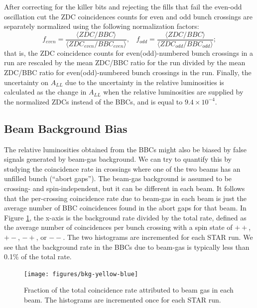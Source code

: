 After correcting for the killer bits and rejecting the fills that fail the
even-odd oscillation cut the ZDC coincidences counts for even and odd bunch
crossings are separately normalized using the following normalization factors:
%
\begin{equation}
  f_{even} = \frac{\langle ZDC/BBC \rangle}{\langle ZDC_{even}/BBC_{even} \rangle}, ~~~~
  f_{odd} = \frac{\langle ZDC/BBC \rangle}{\langle ZDC_{odd}/BBC_{odd} \rangle};
\end{equation}
%
that is, the ZDC coincidence counts for even(odd)-numbered bunch crossings in a
run are rescaled by the mean ZDC/BBC ratio for the run divided by the mean
ZDC/BBC ratio for even(odd)-numbered bunch crossings in the run. Finally, the
uncertainty on $A_{LL}$ due to the uncertainty in the relative luminosities is
calculated as the change in \(A_{LL}\) when the relative luminosities are
supplied by the normalized ZDCs instead of the BBCs, and is equal to
$9.4\times10^{-4}$.

\subsection{Beam Background Bias}


The relative luminosities obtained from the BBCs might also be biased by false
signals generated by beam-gas background. We can try to quantify this by
studying the coincidence rate in crossings where one of the two beams has an
unfilled bunch (``abort gaps''). The beam-gas background is assumed to be
crossing- and spin-independent, but it can be different in each beam. It follows
that the per-crossing coincidence rate due to beam-gas in each beam is just the
average number of BBC coincidences found in the abort gaps for that beam. In
Figure \ref{fig:bkg-yellow-blue}, the x-axis is the background rate divided by
the total rate, defined as the average number of coincidences per bunch crossing
with a spin state of \(++\), \(+-\), \(-+\), or \(--\). The two histograms are
incremented for each STAR run. We see that the background rate in the BBCs due
to beam-gas is typically less than 0.1\% of the total rate.

\begin{figure}
  \texttt{[image: figures/bkg-yellow-blue]}
  \caption{Fraction of the total coincidence rate attributed to beam gas in
  each beam. The histograms are incremented once for each STAR run.}
  \label{fig:bkg-yellow-blue}
\end{figure}

